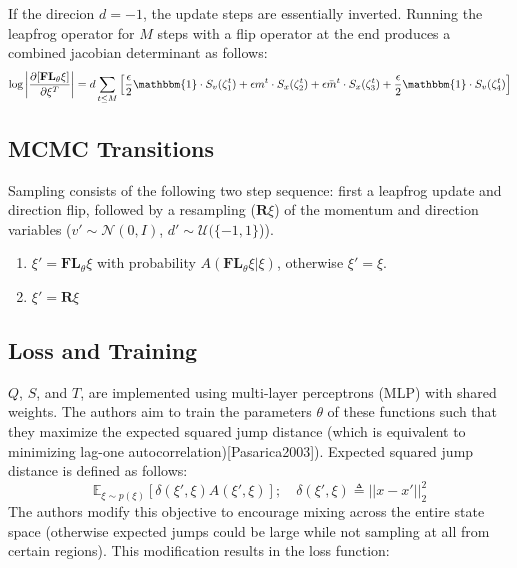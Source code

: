 \documentclass[twoside]{article}
\renewcommand{\cite}[1]{[#1]}
\begin{document}
If the direcion $d=-1$, the update steps are essentially inverted. Running the leapfrog operator for $M$ steps with a flip operator at the end produces a combined jacobian determinant as follows:
\begin{equation}
    \text{log} \left|\frac{\partial[\textbf{FL}_\theta\xi]}{\partial \xi^T}\right| = d \sum_{t\leq M} \left[\frac{\epsilon}{2}\mathbbm{1} \cdot S_v(\zeta_1^t) + \epsilon m^t \cdot S_x(\zeta_2^t) + \epsilon \Bar{m}^t \cdot S_x(\zeta_3^t) + \frac{\epsilon}{2}\mathbbm{1} \cdot S_v(\zeta_4^t)\right]
\end{equation}

\subsection{MCMC Transitions}
Sampling consists of the following two step sequence: first a leapfrog update and direction flip, followed by a resampling ($\textbf{R}\xi$) of the momentum and direction variables ($v' \sim \mathcal{N}(0,I)$, $d' \sim \mathcal{U}(\{-1,1\}$)).
\begin{enumerate}
    \item $\xi' = \textbf{FL}_\theta \xi$ with probability $A(\textbf{FL}_\theta\xi|\xi)$, otherwise $\xi'=\xi$.
    \item $\xi' = \textbf{R}\xi$
\end{enumerate}

\subsection{Loss and Training}
$Q$, $S$, and $T$, are implemented using multi-layer perceptrons (MLP) with shared weights. The authors aim to train the parameters $\theta$ of these functions such that they maximize the expected squared jump distance (which is equivalent to minimizing lag-one autocorrelation)\cite{Pasarica2003}). Expected squared jump distance is defined as follows:
\begin{equation}
    \mathbb{E}_{\xi \sim p(\xi)} [\delta(\xi',\xi)A(\xi',\xi)]; \quad \delta(\xi',\xi) \triangleq ||x-x'||_2^2
\end{equation}
The authors modify this objective to encourage mixing across the entire state space (otherwise expected jumps could be large while not sampling at all from certain regions). This modification results in the loss function:
\end{document}
